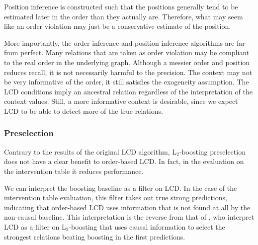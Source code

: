 Position inference is constructed such that the positions generally tend to be estimated later in the order than they actually are. Therefore, what may seem like an order violation may just be a conservative estimate of the position.

More importantly, the order inference and position inference algorithms are far from perfect. Many relations that are taken as order violation may be compliant to the real order in the underlying graph. Although a messier order and position reduces recall, it is not necessarily harmful to the precision. The context may not be very informative of the order, it still satisfies the exogeneity assumption. The LCD conditions imply an ancestral relation regardless of the interpretation of the context values. Still, a more informative context is desirable, since we expect LCD to be able to detect more of the true relations.


\subsubsection{Preselection}
Contrary to the results of the original LCD algorithm, L$_2$-boosting preselection does not have a clear benefit to order-based LCD. In fact, in the evaluation on the intervention table it reduces performance. 

We can interpret the boosting baseline as a filter on LCD. In the case of the intervention table evaluation, this filter takes out true strong predictions, indicating that order-based LCD uses information that is not found at all by the non-causal baseline. This interpretation is the reverse from that of \citet{versteeg2019boosting}, who interpret LCD as a filter on L$_2$-boosting that uses causal information to select the strongest relations beating boosting in the first predictions. 







